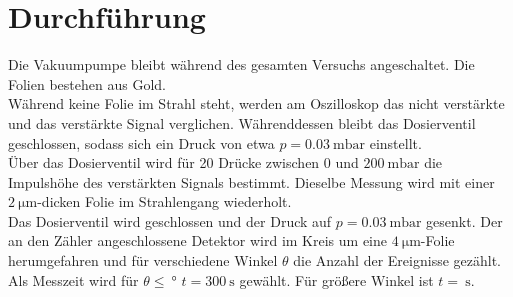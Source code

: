 \section{Durchführung}
\label{sec:Durchführung}

Die Vakuumpumpe bleibt während des gesamten Versuchs angeschaltet.
Die Folien bestehen aus Gold.\\
\newline
Während keine Folie im Strahl steht, werden am Oszilloskop das nicht verstärkte und das verstärkte Signal verglichen. Währenddessen bleibt das Dosierventil geschlossen, sodass sich ein Druck von etwa $p=\SI{0,03}{\milli\bar}$ einstellt.\\
Über das Dosierventil wird für 20 Drücke zwischen $0$ und $\SI{200}{\milli\bar}$ die Impulshöhe des verstärkten Signals bestimmt.
Dieselbe Messung wird mit einer $\SI{2}{\micro\meter}$-dicken Folie im Strahlengang wiederholt.\\
Das Dosierventil wird geschlossen und der Druck auf $p=\SI{0,03}{\milli\bar}$ gesenkt.
Der an den Zähler angeschlossene Detektor wird im Kreis um eine $\SI{4}{\micro\meter}$-Folie herumgefahren und für verschiedene Winkel $\theta$ die Anzahl der Ereignisse gezählt. Als Messzeit wird für $\theta\leq\SI{}{\degree}$ $t=\SI{300}{\second}$ gewählt. Für größere Winkel ist $t=\SI{}{\second}$.



